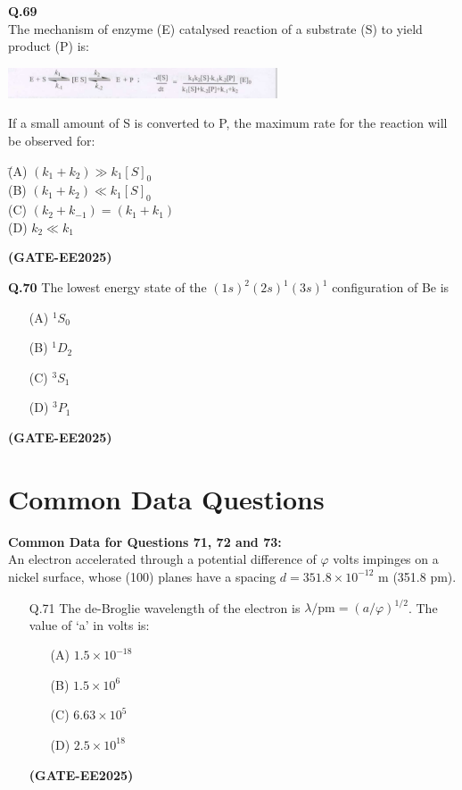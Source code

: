 \documentclass[12pt]{article}
\begin{document}
\begin{enumerate}
\vspace{0.5cm}

\textbf{Q.69} \\
The mechanism of enzyme (E) catalysed reaction of a substrate (S) to yield product (P) is:

\begin{center}
\includegraphics[width=0.6\textwidth]{figs/q69.png}
\end{center}

If a small amount of S is converted to P, the maximum rate for the reaction will be observed for:

\begin{tabbing}
\hspace{1cm} \= (A) \quad $(k_1 + k_2) \gg k_1 [S]_0$ \\
\> (B) \quad $(k_1 + k_2) \ll k_1 [S]_0$ \\
\> (C) \quad $(k_2 + k_{-1}) = (k_1 + k_1)$ \\
\> (D) \quad $k_2 \ll k_1$
\end{tabbing}   \textbf{(GATE-EE2025)}


\textbf{Q.70} The lowest energy state of the $(1s)^2(2s)^1(3s)^1$ configuration of Be is

\begin{enumerate}
\item[(A)] $^1S_0$
\item[(B)] $^1D_2$
\item[(C)] $^3S_1$
\item[(D)] $^3P_1$
\end{enumerate}   \textbf{(GATE-EE2025)}


\vspace{0.5cm}


\section*{Common Data Questions}

\textbf{Common Data for Questions 71, 72 and 73:} \\
An electron accelerated through a potential difference of $\varphi$ volts impinges on a nickel surface, whose (100) planes have a spacing $d = 351.8 \times 10^{-12}$ m (351.8 pm).

\begin{itemize}
    \item[Q.71] The de-Broglie wavelength of the electron is $\lambda/\text{pm} = (a/\varphi)^{1/2}$. The value of ‘a’ in volts is:
    \begin{enumerate}
        \item[(A)] $1.5 \times 10^{-18}$
        \item[(B)] $1.5 \times 10^6$
        \item[(C)] $6.63 \times 10^5$
        \item[(D)] $2.5 \times 10^{18}$
    \end{enumerate}   \textbf{(GATE-EE2025)}



\end{itemize}
\end{enumerate}
\end{document}
